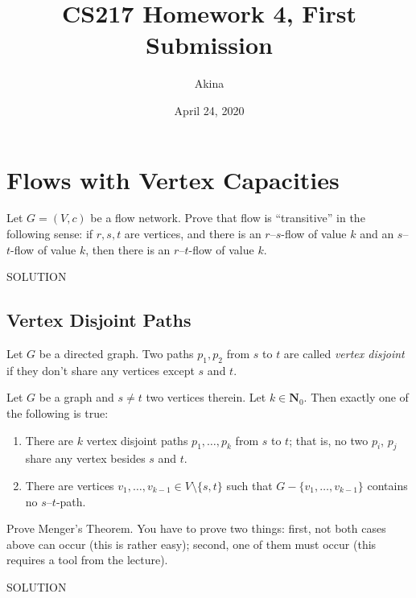 \documentclass[11pt,a4paper,oneside]{article}
\renewcommand{\hwtitle} {CS217 Homework 4, First Submission}
\renewcommand{\hwauthor}{Akina}
\renewcommand{\hwdate}{April 24, 2020}
\begin{document}
\title{\hwtitle}
\author{\hwauthor}
\date{\hwdate}
\maketitle



\setcounter{section}{4}
\section{Flows with Vertex Capacities}


\begin{problem}{1}
	\statement
    Let $G = (V,c)$ be a flow network. Prove that flow is ``transitive'' in the following sense: if $r,s,t$ are vertices, 
    and there is an $r$--$s$-flow of value $k$ and an $s$--$t$-flow of value $k$, then there is an $r$--$t$-flow of 
    value $k$.
    
    \solution
    SOLUTION
\end{problem}

\subsection{Vertex Disjoint Paths}

Let $G$ be a directed graph. Two paths $p_1, p_2$ from $s$ to $t$ are called {\em vertex disjoint}
if they don't share any vertices except $s$ and $t$. 

\begin{theorem}
   Let $G$ be a graph and $s \ne t$ two vertices therein. Let $k \in \mathbf{N}_0$. 
   Then exactly one of the following is true:
   \begin{enumerate}
   \item There are $k$ vertex disjoint paths $p_1,\dots,p_k$ from $s$ to $t$; that is, no two $p_i$, $p_j$ share
   any vertex besides $s$ and $t$.
   \item There are vertices $v_1,\dots,v_{k-1} \in V \setminus \{s,t\}$ such that
   $G - \{v_1,\dots, v_{k-1}\}$ contains no $s$--$t$-path.
   \end{enumerate}
\end{theorem}

\begin{problem}{3}
	\statement
   Prove Menger's Theorem. You have to prove two things: first, not both cases above can occur (this is rather easy);
   second, one of them must occur (this requires a tool from the lecture).
   
    \solution
    SOLUTION
\end{problem}
\end{document}
